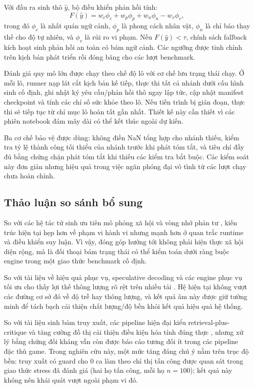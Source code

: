 ﻿\documentclass[a4paper,12pt]{article}
\begin{document}
Với đầu ra sinh thô \(\hat{y}\), bộ điều khiển phản hồi tính:
\[
F(\hat{y}) = w_c \phi_c + w_p \phi_p + w_n \phi_n - w_v \phi_v,
\]
trong đó \(\phi_c\) là nhất quán ngữ cảnh, \(\phi_p\) là phong cách nhân vật, \(\phi_n\) là chỉ báo thay thế cho độ tự nhiên, và \(\phi_v\) là rủi ro vi phạm. Nếu \(F(\hat{y}) < \tau\), chính sách fallback kích hoạt sinh phản hồi an toàn có bám ngữ cảnh. Các ngưỡng được tinh chỉnh trên kịch bản phát triển rồi đóng băng cho các lượt benchmark.

Đánh giá quy mô lớn được chạy theo chế độ lô với cơ chế lưu trạng thái chạy. Ở mỗi lô, runner nạp lát cắt kịch bản kế tiếp, thực thi tất cả nhánh dưới cấu hình sinh cố định, ghi nhật ký yêu cầu/phản hồi thô ngay lập tức, cập nhật manifest checkpoint và tính các chỉ số sức khỏe theo lô. Nếu tiến trình bị gián đoạn, thực thi sẽ tiếp tục từ chỉ mục lô hoàn tất gần nhất. Thiết kế này cần thiết vì các phiên notebook đám mây dài có thể kết thúc ngoài dự kiến.

Ba cơ chế bảo vệ được dùng: không điền NaN tổng hợp cho nhánh thiếu, kiểm tra tỷ lệ thành công tối thiểu của nhánh trước khi phát tóm tắt, và tiêu chí đầy đủ bằng chứng chặn phát tóm tắt khi thiếu các kiểm tra bắt buộc. Các kiểm soát này đơn giản nhưng hiệu quả trong việc ngăn phóng đại vô tình từ các lượt chạy chưa hoàn chỉnh.

\subsection{Thảo luận so sánh bổ sung}
So với các hệ tác tử sinh ưu tiên mô phỏng xã hội và vòng nhớ phản tư \cite{Park2023GenerativeAgents}, kiến trúc hiện tại hẹp hơn về phạm vi hành vi nhưng mạnh hơn ở quan trắc runtime và điều khiển suy luận. Vì vậy, đóng góp hướng tới không phải hiện thực xã hội diện rộng, mà là đối thoại bám trạng thái có thể kiểm toán dưới ràng buộc engine trong một giao thức benchmark cố định.

So với tài liệu về hiệu quả phục vụ, speculative decoding và các engine phục vụ tối ưu cho thấy lợi thế thông lượng rõ rệt trên nhiều tải \cite{Leviathan2022SpecDec,Kwon2023vLLM}. Hệ hiện tại không vượt các đường cơ sở đó về độ trễ hay thông lượng, và kết quả âm này được giữ tường minh để tách bạch cải thiện chất lượng/độ bền khỏi kết quả hiệu quả hệ thống.

So với tài liệu sinh bám truy xuất, các pipeline hiện đại kiểu retrieval-plus-critique và tăng cường đồ thị cải thiện điều kiện hóa tính đúng thực \cite{Asai2024SelfRAG,Edge2024GraphRAG,Fan2024RAGSurvey}, nhưng xử lý bằng chứng đối kháng vẫn còn được báo cáo tương đối ít trong các pipeline đặc thù game. Trong nghiên cứu này, một mức tăng đáng chú ý nằm trên trục độ bền: truy xuất có guard cho 0 ca làm theo chỉ thị tấn công được quan sát trong giao thức stress đã đánh giá (hai họ tấn công, mỗi họ \(n=100\)); kết quả này không nên khái quát vượt ngoài phạm vi đó.
\end{document}
